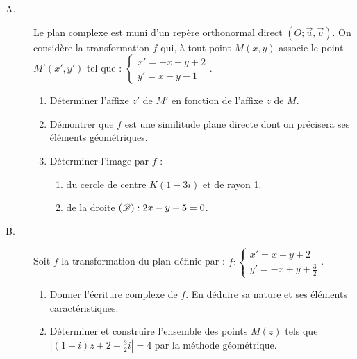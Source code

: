 \begin{exo} %
      \begin{description}
            \item[A.]
                  Le plan complexe est muni d'un rep\`ere orthonormal direct $(O;\vec{u},\vec{v})$.
                  On consid\`ere la transformation $f$ qui, \`a tout point $M(x,y)$ 
                  associe le point $M'(x',y')$ tel que :
                  $\displaystyle{ \left\lbrace \begin{array}{l} x' = -x-y+2 \\ y' = x-y-1 \end{array} \right. }$.
                  \begin{enumerate}
                        \item D\'eterminer l'affixe $z'$ de $M'$ en fonction de l'affixe $z$ de $M$.
                        \item D\'emontrer que $f$ est une similitude plane directe dont on pr\'ecisera ses 
                              \'el\'ements g\'eom\'etriques.
                        \item D\'eterminer l'image par $f$ :
                              \begin{enumerate}
                                    \item du cercle de centre $K(1-3i)$ et de rayon 1.
                                    \item de la droite $(\mathscr{D}) : 2x-y+5=0$.
                              \end{enumerate}
                  \end{enumerate}
            \item[B.]
                  Soit $f$ la transformation du plan d\'efinie par : 
                  $f : \left\lbrace \begin{array}{l} x' = x + y + 2 \\ y' = -x + y +\frac{3}{2} \end{array} \right.$.
                  \begin{enumerate}
                        \item Donner l'\'ecriture complexe de $f$.
                              En d\'eduire sa nature et ses \'el\'ements caract\'eristiques.
                        \item D\'eterminer et construire l'ensemble des points $M(z)$ tels que 
                              $| (1-i)z + 2 + \frac{3}{2}i | = 4$ par la m\'ethode g\'eom\'etrique.
                  \end{enumerate}
      \end{description}
\end{exo}
